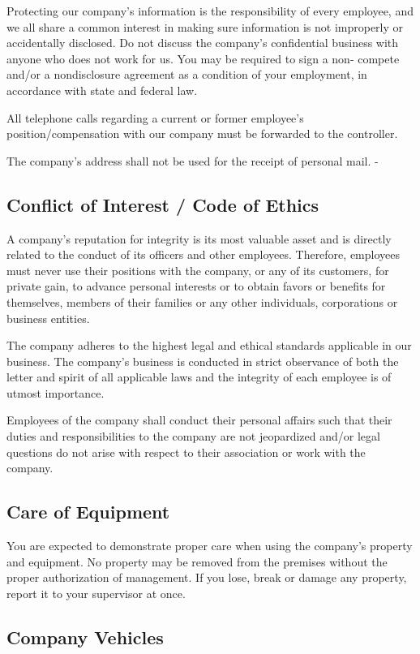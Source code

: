 Protecting our company's information is the responsibility of every employee, and we all share a common interest in making sure information is not improperly or accidentally disclosed. Do not discuss the company's confidential business with anyone who does not work for us. You may be required to sign a non- compete and/or a nondisclosure agreement as a condition of your employment, in accordance with state and federal law.

All telephone calls regarding a current or former employee's position/compensation with our company must be forwarded to the controller.

The company's address shall not be used for the receipt of personal mail. -

\subsection{Conflict of Interest / Code of Ethics}

A company's reputation for integrity is its most valuable asset and is directly related to the conduct of its officers and other employees. Therefore, employees must never use their positions with the company, or any of its customers, for private gain, to advance personal interests or to obtain favors or benefits for themselves, members of their families or any other individuals, corporations or business entities.

The company adheres to the highest legal and ethical standards applicable in our business. The company's business is conducted in strict observance of both the letter and spirit of all applicable laws and the integrity of each employee is of utmost importance.

Employees of the company shall conduct their personal affairs such that their duties and responsibilities to the company are not jeopardized and/or legal questions do not arise with respect to their association or work with the company.

\subsection{Care of Equipment}

You are expected to demonstrate proper care when using the company's property and equipment. No property may be removed from the premises without the proper authorization of management. If you lose, break or damage any property, report it to your supervisor at once.

\subsection{Company Vehicles}

